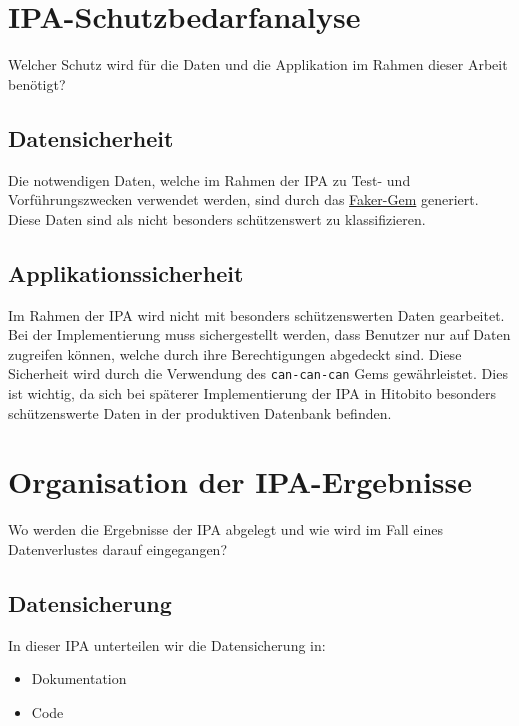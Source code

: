 \chapter{IPA-Schutzbedarfanalyse}
Welcher Schutz wird für die Daten und die Applikation im Rahmen dieser Arbeit benötigt?

\section{Datensicherheit}
Die notwendigen Daten, welche im Rahmen der IPA zu Test- und Vorführungszwecken verwendet werden,
sind durch das \href{https://github.com/faker-ruby/faker}{Faker-Gem} generiert. Diese Daten sind als nicht besonders 
schützenswert zu klassifizieren.

\section{Applikationssicherheit}
Im Rahmen der IPA wird nicht mit besonders schützenswerten Daten gearbeitet. Bei der Implementierung muss sichergestellt werden, dass
Benutzer nur auf Daten zugreifen können, welche durch ihre Berechtigungen abgedeckt sind. Diese Sicherheit wird durch die Verwendung
des \texttt{can-can-can} Gems gewährleistet. Dies ist wichtig, da sich bei späterer Implementierung der IPA in 
Hitobito besonders schützenswerte Daten in der produktiven Datenbank befinden.

\chapter{Organisation der IPA-Ergebnisse}
Wo werden die Ergebnisse der IPA abgelegt und wie wird im Fall eines Datenverlustes darauf eingegangen?

\section{Datensicherung}
In dieser IPA unterteilen wir die Datensicherung in:

\begin{itemize}
\item Dokumentation
\item Code
\end{itemize}

